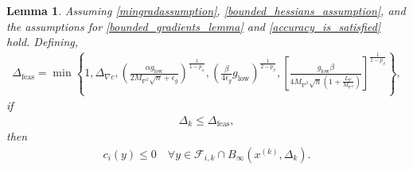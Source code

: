 \documentclass{article}
\newtheorem{lemma}[theorem]{Lemma}
\theoremstyle{case}
\newcommand{\lipgrad}{{L_{\nabla}}}
\newcommand{\maxhessian}{{M_{\nabla^2}}}
\newcommand{\xk}{{x^{(k)}}}
\newcommand{\dk}{\Delta_k}
\newcommand{\dfeas}{{\Delta_{\text{feas}}}}
\newcommand{\fik}{{\mathcal F_{i, k}}}
\newcommand{\tr}{{ B_{\infty}\left(\xk, \dk\right) }}
\newcommand{\mingraddelta}{{\Delta_{\nabla c}}}
\newcommand{\mingrad}{{ g_{\text{low}} }}
\begin{document}
\begin{lemma}
\label{each_constraints_cone_is_feasible}
Assuming \cref{mingradassumption}, \cref{bounded_hessians_assumption}, and the assumptions for \cref{bounded_gradients_lemma} and \cref{accuracy_is_satisfied} hold.
Defining,
\begin{align}
\dfeas = \min\left\{
1,
\mingraddelta,
\left(\frac{\alpha \mingrad}{2 \maxhessian \sqrt{n} + \epsilon_g}\right)^{\frac 1 {1-p_{\alpha}}},
\left(\frac{\beta}{4\epsilon_{g}}\mingrad\right)^{\frac 1 {2 - p_{\beta}}},
\left[\frac {\mingrad  \beta} {4\maxhessian\sqrt{n}\left(1 + \frac {\lipgrad} \maxhessian \right)}\right]^{\frac1 {1 - p_{\beta}} }
\right\},
\end{align}
if
\begin{align}
\dk \le \dfeas, \label{delta_is_small_enough}
\end{align} then
\begin{align*}
c_i(y) \le 0 \quad \forall y \in \fik \cap \tr.
\end{align*}
\end{lemma}
\end{document}
